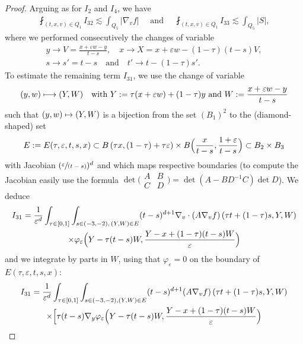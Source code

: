 \documentclass[10pt]{amsart}
\def\mto{\mathchoice{\longmapsto}{\mapsto}{\mapsto}{\mapsto}}
\newcommand{\spfrac}[2]{\sfrac{#1}{(#2)}}
\theoremstyle{definition}
\theoremstyle{remark}
\let\var\varepsilon
\begin{document}
\begin{proof}
Arguing as for $I_2$ and $I_4$, we have
\begin{align}
\label{estim I323}
\fint_{(t,x,v) \in Q_1} I_{32} \lesssim \int_{Q_5} \left|
\nabla_v f\right| \quad \text{ and } \quad
\fint_{(t,x,v) \in Q_1} I_{33} \lesssim \int_{Q_5} |S|,
\end{align}
where we performed consecutively the changes of variable
\begin{gather*}
y\to V=\frac{x+\varepsilon w-y}{t-s},\quad
x\to X= x+\varepsilon w -(1-\tau)(t-s)V,\\
s\to s'=t-s\quad \text{and}\quad t'\to t-(1-\tau)s'.
\end{gather*}
To estimate the remaining term $I_{31}$, we use the change of
variable
\begin{equation}
\label{eq:change-variables}
(y,w) \mto (Y,W) \quad \text{with }
Y:=\tau (x+\varepsilon w)+(1-\tau)y \text{ and } W:=\frac{x+\varepsilon w -y}{t-s}
\end{equation}
such that $(y,w)\mto (Y,W)$ is a bijection from the set
$(B_1)^2$ to the (diamond-shaped) set
\begin{equation*}
E:=E(\tau,\varepsilon,t,s,x) \subset B\left(\tau x, (1-\tau)
+ \tau \var\right)
\times B\Bigl(\frac{x}{t-s},\frac{1+\var}{t-s}\Bigr)
\subset B_2 \times B_3
\end{equation*}
with Jacobian $(\spfrac{\var}{t-s})^d$ and which maps
respective boundaries (to compute the Jacobian easily use the
formula
$\det \bigl( \begin{smallmatrix} A & B \\ C & D \end{smallmatrix}\bigr) =
\det(A - B D^{-1} C) \det D$). We deduce
\begin{multline*}
I_{31} = \frac{1}{\varepsilon^d} \int_{\tau\in
[0,1]}\int_{s\in (-3,-2), \, (Y,W)\in E}
(t-s)^{d+1}\nabla_v\cdot (A
\nabla_v f)\left(\tau
t+(1-\tau)s,Y,W\right)\\
\times \varphi_{\varepsilon} \Bigl(Y-\tau
(t-s)W,\frac{Y-x+(1-\tau)(t-s)W}{\varepsilon} \Bigr)
\end{multline*}
and we integrate by parts in $W$, using that $\varphi_\var=0$
on the boundary of $E(\tau,\var,t,s,x)$:
\begin{multline*}
I_{31}=
\frac{1}{\varepsilon^d}\int_{\tau \in
[0,1]}\int_{s\in (-3,-2), (Y,W)\in E} (t-s)^{d+1}(A \nabla_v
f)\left(\tau t+(1-\tau)s,Y,W\right) \\
\times \Bigl[\tau (t-s)\nabla_y\varphi_\var
\Bigl(Y - \tau (t-s)W,\frac{Y-x+(1-\tau)(t-s)W}{\varepsilon}
\Bigr)\\

\end{multline*}
\end{proof}
\end{document}
